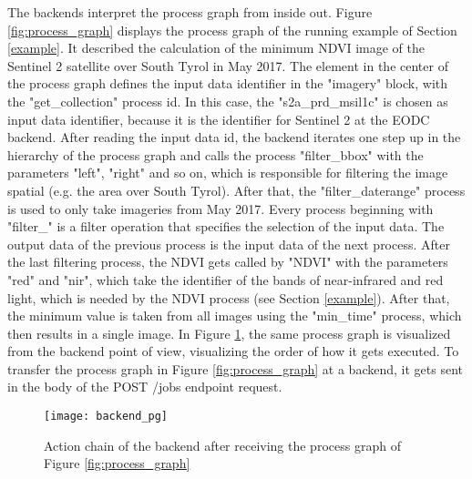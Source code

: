 \documentclass[draft,final]{vutinfth} %
\begin{document}
The backends interpret the process graph from inside out. Figure \ref{fig:process_graph} displays the process graph of the running example of Section \ref{example}. It described the calculation of the minimum NDVI image of the Sentinel 2 satellite over South Tyrol in May 2017. The element in the center of the process graph defines the input data identifier in the "imagery" block, with the "get\_collection" process id. In this case, the "s2a\_prd\_msil1c" is chosen as input data identifier, because it is the identifier for Sentinel 2 at the EODC backend.
After reading the input data id, the backend iterates one step up in the hierarchy of the process graph and calls the process "filter\_bbox" with the parameters "left", "right" and so on, which is responsible for filtering the image spatial (e.g. the area over South Tyrol). After that, the "filter\_daterange" process is used to only take imageries from May 2017. Every process beginning with "filter\_" is a filter operation that specifies the selection of the input data. The output data of the previous process is the input data of the next process. After the last filtering process, the NDVI gets called by "NDVI" with the parameters "red" and "nir", which take the identifier of the bands of near-infrared and red light, which is needed by the NDVI process (see Section \ref{example}). After that, the minimum value is taken from all images using the "min\_time" process, which then results in a single image. In Figure \ref{fig:process_graph_diagram}, the same process graph is visualized from the backend point of view, visualizing the order of how it gets executed. To transfer the process graph in Figure \ref{fig:process_graph} at a backend, it gets sent in the body of the POST /jobs endpoint request.

\begin{figure}[h]
	\centering
	\texttt{[image: backend\_pg]}
	\caption{Action chain of the backend after receiving the process graph of Figure \ref{fig:process_graph}}
	\label{fig:process_graph_diagram} %
\end{figure}
\end{document}
